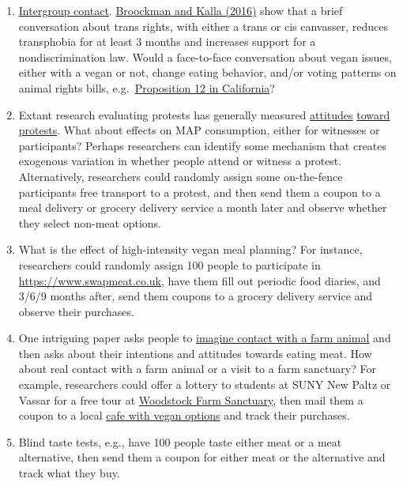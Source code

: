 \documentclass[
  letterpaper,
  DIV=11,
  numbers=noendperiod]{scrartcl}
\providecommand{\tightlist}{%
  \setlength{\itemsep}{0pt}\setlength{\parskip}{0pt}}\usepackage{longtable,booktabs,array}
\begin{document}
\begin{enumerate}
\def\labelenumi{\arabic{enumi}.}
\tightlist
\item
  \href{https://www.cambridge.org/core/journals/behavioural-public-policy/article/contact-hypothesis-reevaluated/142C913E7FA9E121277B29E994124EC5}{Intergroup
  contact}.
  \href{https://www.science.org/doi/10.1126/science.aad9713}{Broockman
  and Kalla (2016)} show that a brief conversation about trans rights,
  with either a trans or cis canvasser, reduces transphobia for at least
  3 months and increases support for a nondiscrimination law. Would a
  face-to-face conversation about vegan issues, either with a vegan or
  not, change eating behavior, and/or voting patterns on animal rights
  bills,
  e.g.~\href{https://www.vox.com/future-perfect/23721488/prop-12-scotus-pork-pigs-factory-farming-california-bacon}{Proposition
  12 in California}?
\item
  Extant research evaluating protests has generally measured
  \href{https://onlinelibrary.wiley.com/doi/abs/10.1002/ejsp.1983}{attitudes}
  \href{https://papers.ssrn.com/sol3/papers.cfm?abstract_id=2911177}{toward}
  \href{https://animalcharityevaluators.org/research/reports/protests/}{protests}.
  What about effects on MAP consumption, either for witnesses or
  participants? Perhaps researchers can identify some mechanism that
  creates exogenous variation in whether people attend or witness a
  protest. Alternatively, researchers could randomly assign some
  on-the-fence participants free transport to a protest, and then send
  them a coupon to a meal delivery or grocery delivery service a month
  later and observe whether they select non-meat options.
\item
  What is the effect of high-intensity vegan meal planning? For
  instance, researchers could randomly assign 100 people to participate
  in \href{https://www.swapmeat.co.uk/}{https://www.swapmeat.co.uk},
  have them fill out periodic food diaries, and 3/6/9 months after, send
  them coupons to a grocery delivery service and observe their
  purchases.
\item
  One intriguing paper asks people to
  \href{https://www.sciencedirect.com/science/article/abs/pii/S0195666321005638}{imagine
  contact with a farm animal} and then asks about their intentions and
  attitudes towards eating meat. How about real contact with a farm
  animal or a visit to a farm sanctuary? For example, researchers could
  offer a lottery to students at SUNY New Paltz or Vassar for a free
  tour at \href{https://woodstocksanctuary.org/}{Woodstock Farm
  Sanctuary}, then mail them a coupon to a local
  \href{https://karmaroad.net/}{cafe with vegan options} and track their
  purchases.
\item
  Blind taste tests, e.g., have 100 people taste either meat or a meat
  alternative, then send them a coupon for either meat or the
  alternative and track what they buy.
\end{enumerate}
\end{document}
